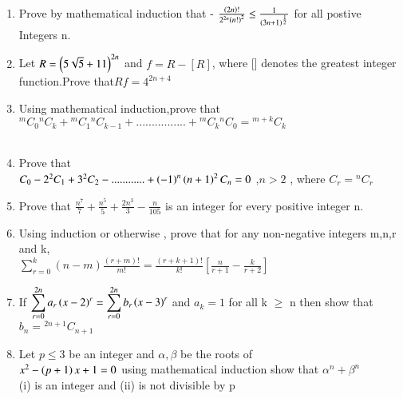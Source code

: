 \documentclass[journal,12pt,twocolumn]{IEEEtran}
\theoremstyle{remark}
\begin{document}
\begin{enumerate}
	    \item Prove by mathematical induction that -
		    $\frac{\left(2n\right)!}{2^{2n}\left(n!\right)^2}\leq \frac{1}{\left(3n+1\right)^{\frac{1}{2}}}$  for all postive Integers n.\\\hspace*{\fill} 

	    \item Let $R =\left(5\sqrt{5}+11\right)^{2n}$ and $f = R -[R] $, where [] denotes the greatest integer function.Prove  that$ Rf =4^{2n+4}$  \hspace*{\fill} \\

	    \item Using mathematical induction,prove that
		    ${}^mC_0{}^nC_k +{}^mC_1{}^nC_{k-1}+................+{}^mC_k{}^nC_0 ={}^{m+k}C_k$\\\hspace*{\fill} \\
	    \item Prove that \hspace*{\fill} \\$C_0-2^2C_1+3^2C_2-............+\left(-1\right)^n\left(n+1\right)^2C_n =0$ ,$n>2$ , where $C_r={}^nC_r$\\

	    \item Prove that   $ \frac{n^7}{7}+\frac{n^5}{5}+\frac{2n^3}{3}-\frac{n}{105}$ is an integer for every positive integer n. \hspace*{\fill} \\


	    \item Using induction or otherwise , prove that for any non-negative integers m,n,r and k,\\$\displaystyle\sum_{r=0}^{k}(n-m)\frac{(r+m)!}{m!}= \frac{(r+k+1)!}{k!}[\frac{n}{r+1}-\frac{k}{r+2}]$ \hspace*{\fill} 

	    \item If $\displaystyle\sum_{r=0}^{2n}a_r\left(x-2\right)^r=\displaystyle\sum_{r=0}^{2n}b_r$$\left(x-3\right)^r$ and $a_k =1$ for all k $\geq$ n then show that $b_n = {}^{2n+1}C_{n+1}$ \hspace*{\fill} 

	    \item Let  $p\leq 3$ be an integer and $\alpha,\beta$ be  the roots of\\  $x^2-\left(p+1\right)x+1=0 $ using mathematical induction show that $\alpha^n +\beta^n$\\ (i) is an integer and   
		    (ii) is not divisible by p  \hspace*{\fill} 
		    
 \end{enumerate}
 
\end{document}
